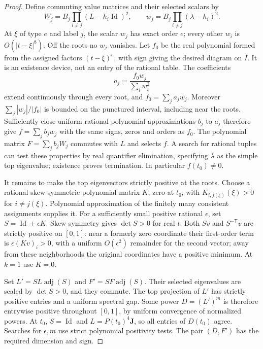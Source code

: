 \begin{proof}
Define commuting value matrices and their selected scalars by
\[
W_j=B_j\prod_{i\ne j}(L-h_i\operatorname{Id})^2,
\qquad w_j=B_j\prod_{i\ne j}(\lambda-h_i)^2.
\]
At \(\xi\) of type \(e\) and label \(j\), the scalar \(w_j\) has exact order \(e\); every other \(w_i\) is \(O(|t-\xi|^8)\). Off the roots no \(w_j\) vanishes. Let \(f_0\) be the real polynomial formed from the assigned factors \((t-\xi)^e\), with sign giving the desired diagram on \(I\). It is an existence device, not an entry of the rational table. The coefficients
\[
a_j=\frac{f_0w_j}{\sum_iw_i^2}
\]
extend continuously through every root, and \(f_0=\sum_j a_jw_j\). Moreover \(\sum_j|w_j|/|f_0|\) is bounded on the punctured interval, including near the roots. Sufficiently close uniform rational polynomial approximations \(b_j\) to \(a_j\) therefore give \(f=\sum_j b_jw_j\) with the same signs, zeros and orders as \(f_0\). The polynomial matrix \(F=\sum_jb_jW_j\) commutes with \(L\) and selects \(f\). A search for rational tuples can test these properties by real quantifier elimination, specifying \(\lambda\) as the simple top eigenvalue; existence proves termination. In particular \(f(t_0)\ne0\).

It remains to make the top eigenvectors strictly positive at the roots. Choose a rational skew-symmetric polynomial matrix \(K\), zero at \(t_0\), with \(K_{i,j(\xi)}(\xi)>0\) for \(i\ne j(\xi)\). Polynomial approximation of the finitely many consistent assignments supplies it. For a sufficiently small positive rational \(\epsilon\), set \(S=\operatorname{Id}+\epsilon K\). Skew symmetry gives \(\det S>0\) for real \(t\). Both \(Sv\) and \(S^{-\mathsf T}v\) are strictly positive on \([0,1]\): near a formerly zero coordinate their first-order term is \(\epsilon(Kv)_i>0\), with a uniform \(O(\epsilon^2)\) remainder for the second vector; away from these neighborhoods the original coordinates have a positive minimum. At \(k=1\) use \(K=0\).

Set \(L'=SL\operatorname{adj}(S)\) and \(F'=SF\operatorname{adj}(S)\). Their selected eigenvalues are scaled by \(\det S>0\), and they commute. The top projection of \(L'\) has strictly positive entries and a uniform spectral gap. Some power \(D=(L')^m\) is therefore entrywise positive throughout \([0,1]\), by uniform convergence of normalized powers. At \(t_0\), \(S=\operatorname{Id}\) and \(L=P(t_0)^4\mathbf J\), so all entries of \(D(t_0)\) agree. Searches for \(\epsilon,m\) use strict polynomial positivity tests. The pair \((D,F')\) has the required dimension and sign.
\end{proof}

